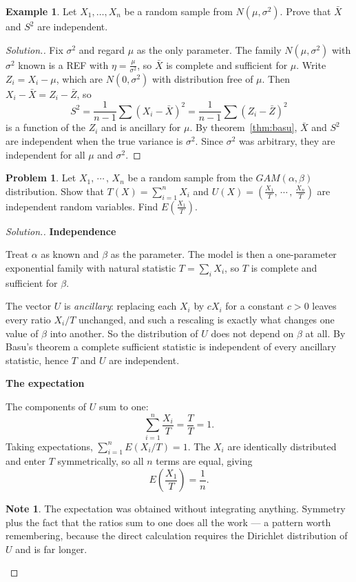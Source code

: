 \documentclass[12pt,a4paper]{report}
\theoremstyle{definition}
\newtheorem{exa}[thm]{Example}
\newtheorem*{note}{Note}
\newcommand{\subhead}[1]{%
  \par\medskip\noindent\textbf{#1}\par\nobreak\smallskip}
\newtheorem{problemx}{Problem}[section]
\newenvironment{problem}{\begin{problemx}}{\end{problemx}}
\newenvironment{solution}
  {\renewcommand{\qedsymbol}{}\begin{proof}[\textit{Solution}.]}
  {\end{proof}}
\begin{document}
\begin{exa}
\label{ex:basunormal}
Let $X_1, \dots, X_n$ be a random sample from $N(\mu, \sigma^2)$. Prove that $\bar X$
and $S^2$ are independent.
\end{exa}

\begin{solution}
Fix $\sigma^2$ and regard $\mu$ as the only parameter. The family
$N(\mu, \sigma^2)$ with $\sigma^2$ known is a REF with $\eta = \frac{\mu}{\sigma^2}$, so
$\bar X$ is complete and sufficient for $\mu$. Write $Z_i = X_i - \mu$, which are
$N(0, \sigma^2)$ with distribution free of $\mu$. Then $X_i - \bar X = Z_i - \bar Z$,
so
\[S^2 = \frac{1}{n - 1}\sum (X_i - \bar X)^2 = \frac{1}{n - 1}\sum (Z_i - \bar Z)^2\]
is a function of the $Z_i$ and is ancillary for $\mu$. By theorem~\ref{thm:basu},
$\bar X$ and $S^2$ are independent when the true variance is $\sigma^2$. Since
$\sigma^2$ was arbitrary, they are independent for all $\mu$ and $\sigma^2$.
\end{solution}

\begin{problem}
Let $X_1, \, \cdots\, , \, X_n$ be a random sample from the $GAM(\alpha, \beta)$ distribution. Show that $T(X) = \sum^n_{i = 1} X_i$ and $U(X) = \left(\frac{X_1}{T}, \, \cdots\, , \, \frac{X_n}{T}\right)$ are independent random variables. Find $E\left(\frac{X_1}{T}\right)$.
\end{problem}

\begin{solution}
\subhead{Independence}
Treat $\alpha$ as known and $\beta$ as the parameter. The model is then a
one-parameter exponential family with natural statistic $T=\sum_i X_i$, so $T$
is complete and sufficient for $\beta$.

The vector $U$ is \emph{ancillary}: replacing each $X_i$ by $cX_i$ for a
constant $c>0$ leaves every ratio $X_i/T$ unchanged, and such a rescaling is
exactly what changes one value of $\beta$ into another. So the distribution of
$U$ does not depend on $\beta$ at all. By Basu's theorem a complete sufficient
statistic is independent of every ancillary statistic, hence $T$ and $U$ are
independent.

\subhead{The expectation}
The components of $U$ sum to one:
\[\sum_{i=1}^{n}\frac{X_i}{T} = \frac{T}{T} = 1 .\]
Taking expectations, $\sum_{i=1}^{n}E\left(X_i/T\right) = 1$. The $X_i$ are
identically distributed and enter $T$ symmetrically, so all $n$ terms are equal,
giving
\[E\left(\frac{X_1}{T}\right) = \frac{1}{n}.\]

\begin{note}
The expectation was obtained without integrating anything. Symmetry plus the
fact that the ratios sum to one does all the work --- a pattern worth
remembering, because the direct calculation requires the Dirichlet distribution
of $U$ and is far longer.
\end{note}
\end{solution}
\end{document}
